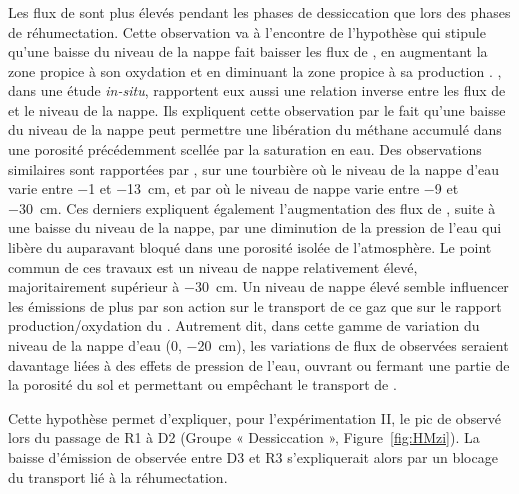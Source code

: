\subsubsection{\chh}
Les flux de \chh sont plus élevés pendant les phases de dessiccation que lors des phases de réhumectation.
Cette observation va à l'encontre de l'hypothèse qui stipule qu'une baisse du niveau de la nappe fait baisser les flux de \chh, en augmentant la zone propice à son oxydation et en diminuant la zone propice à sa production \citep{aerts1997,pelletier2007,turetsky2008}.
\citet{kettunen1996}, dans une étude \textit{in-situ}, rapportent eux aussi une relation inverse entre les flux de \chh et le niveau de la nappe.
Ils expliquent cette observation par le fait qu'une baisse du niveau de la nappe peut permettre une libération du méthane accumulé dans une porosité précédemment scellée par la saturation en eau.
Des observations similaires sont rapportées par \citet{bellisario1999}, sur une tourbière où le niveau de la nappe d'eau varie entre \num{-1} et \SI{-13}{\centi\metre}, et par \citet{treat2007} où le niveau de nappe varie entre \num{-9} et \SI{-30}{\centi\metre}.
Ces derniers expliquent également l'augmentation des flux de \chh, suite à une baisse du niveau de la nappe, par une diminution de la pression de l'eau qui libère du \chh auparavant bloqué dans une porosité isolée de l'atmosphère.
Le point commun de ces travaux est un niveau de nappe relativement élevé, majoritairement supérieur à \SI{-30}{\centi\metre}.
Un niveau de nappe élevé semble influencer les émissions de \chh plus par son action sur le transport de ce gaz que sur le rapport production/oxydation du \chh.
Autrement dit, dans cette gamme de variation du niveau de la nappe d'eau (0, \SI{-20}{\centi\metre}), les variations de flux de \chh observées seraient davantage liées à des effets de pression de l'eau, ouvrant ou fermant une partie de la porosité du sol et permettant ou empêchant le transport de \chh.

Cette hypothèse permet d'expliquer, pour l'expérimentation II, le pic de \chh observé lors du passage de R1 à D2 (Groupe « Dessiccation », Figure~\ref{fig:HMzi}).
La baisse d'émission de \chh observée entre D3 et R3 s'expliquerait alors par un blocage du transport lié à la réhumectation.


